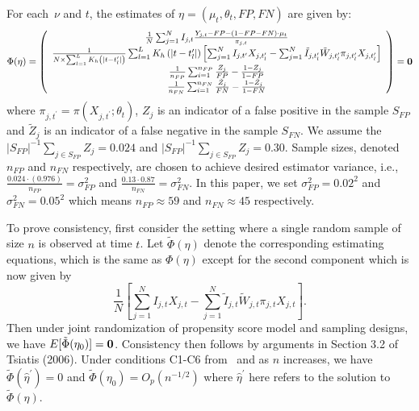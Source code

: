 \documentclass[12pt]{amsart}
\numberwithin{equation}{section}
\theoremstyle{plain}
\begin{document}
For each~$\nu$ and $t$, the estimates of $\eta = (\mu_t, \theta_t, FP, FN)$ are given by:
$$
\Phi (\eta) = \left (
\begin{array}{c}
\frac{1}{N} \sum_{j=1}^N I_{j,t} \frac{Y_{j,t} - FP - (1-FP-FN) \cdot \mu_t}{\pi_{j,t}} \\
\frac{1}{N \times \sum_{l=1}^L K_{h} \left(|t - t_l^\prime| \right)} \sum_{l=1}^L K_{h} \left(|t - t_l^\prime| \right) \left[ \sum_{j=1}^N I_{j,t^\prime} X_{j,t^\prime_l} - \sum_{j = 1}^N \tilde I_{j,t_l^\prime} \tilde W_{j,t_l^\prime}  \pi_{j,t_l^\prime} X_{j,t_l^\prime} \right] \\
\frac{1}{n_{FP}} \sum_{i=1}^{n_{FP}} \frac{Z_j}{FP} - \frac{1-Z_j}{1-FP} \\
\frac{1}{n_{FN}} \sum_{i=1}^{n_{FN}} \frac{\tilde Z_j}{FN} - \frac{1-\tilde Z_j}{1-FN} \\
\end{array}
\right ) = {\bf 0}
$$
where $\pi_{j,t^\prime} = \pi (X_{j,t^\prime}; \theta_t)$, $Z_j$ is an indicator of a false positive in the sample $S_{FP}$  and $\tilde Z_j$ is an indicator of a false negative in the sample $S_{FN}$.  We assume the $|S_{FP}|^{-1} \sum_{j \in S_{FP}} Z_j = 0.024$ and $|S_{FP}|^{-1} \sum_{j \in S_{FP}} Z_j = 0.30$.  Sample sizes, denoted $n_{FP}$ and $n_{FN}$ respectively, are chosen to achieve desired estimator variance, i.e., $\frac{0.024 \cdot (0.976)}{n_{FP}} = \sigma^2_{FP}$ and $\frac{0.13 \cdot 0.87}{n_{FN}} = \sigma^2_{FN}$. In this paper, we set $\sigma^2_{FP} = 0.02^2$ and $\sigma_{FN}^2 = 0.05^2$ which means $n_{FP} \approx 59$ and $n_{FN} \approx 45$ respectively.

To prove consistency, first consider the setting where a single random sample of size $n$ is observed at time $t$.  Let $\tilde \Phi (\eta)$ denote the corresponding estimating equations, which is the same as $\Phi(\eta)$ except for the second component which is now given by
$$
\frac{1}{N} \left[ \sum_{j=1}^N I_{j,t} X_{j,t} - \sum_{j = 1}^N \tilde I_{j,t} \tilde W_{j,t}  \pi_{j,t} X_{j,t} \right].
$$
Then under joint randomization of propensity score model and sampling designs, we have $E [ \tilde \Phi (\eta_0) ] = {\bf 0}$.  Consistency then follows by arguments in Section 3.2 of Tsiatis (2006). Under conditions C1-C6 from~\cite{Chen2019} and as $n$ increases, we have $\tilde \Phi (\hat \eta^\prime) = 0$ and $\tilde \Phi(\eta_0) = O_p ( n^{-1/2} )$ where $\hat \eta^\prime$ here refers to the solution to $\tilde \Phi (\eta)$.
\end{document}
